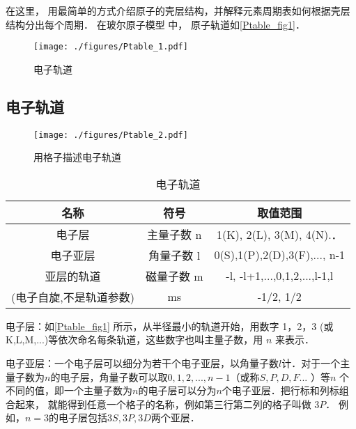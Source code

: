 
\begin{issues}
\issueTODO
\end{issues}

在这里， 用最简单的方式介绍原子的壳层结构，并解释元素周期表如何根据壳层结构分出每个周期． 在玻尔原子模型 中， 原子轨道如\autoref{Ptable_fig1}．

\begin{figure}[ht]
\centering
\texttt{[image: ./figures/Ptable\_1.pdf]}
\caption{电子轨道}\label{Ptable_fig1}
\end{figure}

\subsection{电子轨道}
\begin{figure}[ht]
\centering
\texttt{[image: ./figures/Ptable\_2.pdf]}
\caption{用格子描述电子轨道} 
\end{figure}

\begin{table}[ht]
\centering
\caption{电子轨道}\label{Ptable_tab1}
\begin{tabular}{|c|c|c|}
\hline
名称&符号&取值范围\\
\hline
电子层&主量子数 n& 1(K), 2(L), 3(M), 4(N).． \\
\hline
电子亚层&角量子数 l& 0(S),1(P),2(D),3(F),..., n-1 \\
\hline
亚层的轨道&磁量子数 m & -l, -l+1,...,0,1,2,...,l-1,l \\
\hline
(电子自旋,不是轨道参数)&ms&-1/2, 1/2\\
\hline
\end{tabular}
\end{table}

电子层：如\autoref{Ptable_fig1} 所示，从半径最小的轨道开始，用数字 1，2，3 (或K,L,M,...)等依次命名每条轨道，这些数字也叫主量子数，用 $n$ 来表示． 

电子亚层：一个电子层可以细分为若干个电子亚层，以角量子数$l$计．对于一个主量子数为$n$的电子层，角量子数可以取$0,1,2,...,n-1$（或称$S,P,D,F...$ ）等$n$ 个不同的值，即一个主量子数为$n$的电子层可以分为$n$个电子亚层．把行标和列标组合起来， 就能得到任意一个格子的名称，例如第三行第二列的格子叫做 $3P$． 例如，$n=3$的电子层包括$3S, 3P, 3D$两个亚层．

